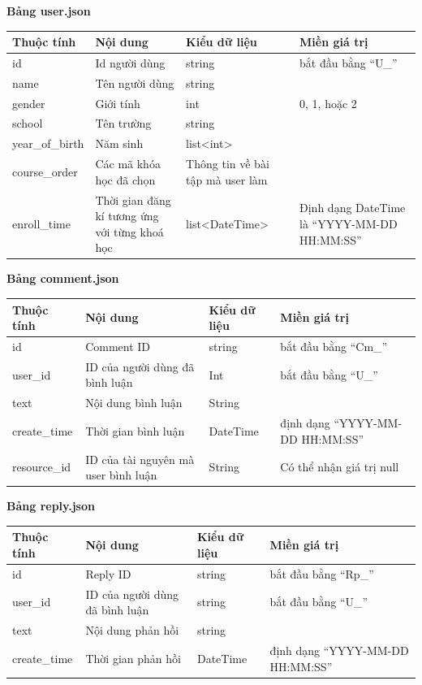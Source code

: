 \newpage\textbf{}
%
\textbf{Bảng user.json}
\begin{center}
\begin{tabular}{|| m{6em}  m{10em}  m{8em}  m{12em}||} 
 \hline
 \textbf{Thuộc tính} & \textbf{Nội dung} & \textbf{Kiểu dữ liệu} & \textbf{Miền giá trị} \\ [0.5ex] 
 \hline\hline
id &Id người dùng & string & bắt đầu bằng “U\_” \\
 \hline
 name &Tên người dùng & string &  \\ \hline
 gender & Giới tính &int &0, 1, hoặc 2\\
 \hline
 school &Tên trường & string &  \\ \hline
 year\_of\_birth &Năm sinh & list<int>&  \\ \hline
 course\_order &Các mã khóa học đã chọn & Thông tin về bài tập mà user làm & \\ \hline
 enroll\_time & Thời gian đăng kí tương ứng với từng khoá học  & list<DateTime>  & Định dạng DateTime là “YYYY-MM-DD HH:MM:SS” \\ [1ex]
 \hline
\end{tabular}
\end{center}
%
\textbf{Bảng comment.json}
\begin{center}
\begin{tabular}{|| m{6em}  m{10em}  m{6em}  m{12em}||} 
 \hline
 \textbf{Thuộc tính} & \textbf{Nội dung} & \textbf{Kiểu dữ liệu} & \textbf{Miền giá trị} \\ [0.5ex] 
 \hline\hline
id & Comment ID & string & bắt đầu bằng “Cm\_” \\
 \hline
 user\_id &ID của người dùng đã bình luận & Int & bắt đầu bằng “U\_” \\ \hline
 text & Nội dung bình luận &String &\\
 \hline
 create\_time &Thời gian bình luận & DateTime & định dạng “YYYY-MM-DD HH:MM:SS” \\ \hline
 resource\_id & ID của tài nguyên mà user bình luận  &String & Có thể nhận giá trị null\\ [1ex] 
 \hline
\end{tabular}
\end{center}
%
%
\textbf{Bảng reply.json}
\begin{center}
\begin{tabular}{|| m{6em}  m{10em}  m{6em}  m{12em}||} 
 \hline
 \textbf{Thuộc tính} & \textbf{Nội dung} & \textbf{Kiểu dữ liệu} & \textbf{Miền giá trị} \\ [0.5ex] 
 \hline\hline
id & Reply ID & string & bắt đầu bằng “Rp\_” \\
 \hline
 user\_id &ID của người dùng đã bình luận & string & bắt đầu bằng “U\_” \\ \hline
 text & Nội dung phản hồi &string &\\
 \hline
 create\_time & Thời gian phản hồi  &DateTime &định dạng “YYYY-MM-DD HH:MM:SS”\\ [1ex] 
 \hline
\end{tabular}
\end{center}
